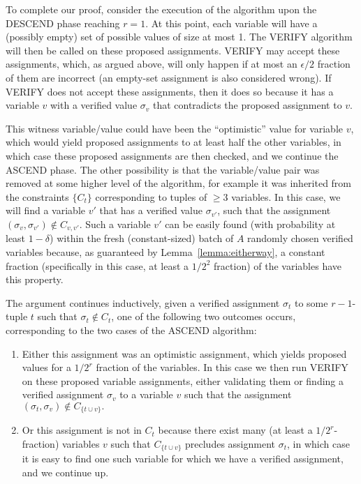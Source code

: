 \documentclass[final,12pt]{colt2018}
\newcommand{\eps}{\epsilon}
\begin{document}
To complete our proof, consider the execution of the algorithm upon the DESCEND phase reaching $r=1$.  At this point, each variable will have a (possibly empty) set of possible values of size at most 1.  The VERIFY algorithm will then be called on these proposed assignments.  VERIFY may accept these assignments, which, as argued above, will only happen if at most an $\eps/2$ fraction of them are incorrect (an empty-set assignment is also considered wrong). If VERIFY does not accept these assignments, then it does so because it has a variable $v$ with a verified value $\sigma_v$ that contradicts the proposed assignment to $v$.

This witness variable/value could have been the ``optimistic'' value for variable $v$, which would yield proposed assignments to at least half the other variables, in which case these proposed assignments are then checked, and we continue the ASCEND phase.  The other possibility is that the variable/value pair was removed at some higher level of the algorithm, for example it was inherited from the constraints $\{C_t\}$ corresponding to tuples of $\ge 3$ variables.  In this case, we will find a variable $v'$ that has a verified value $\sigma_{v'}$, such that the assignment $(\sigma_v,\sigma_{v'}) \not \in C_{v,v'}.$  Such a variable $v'$ can be easily found (with probability at least $1-\delta$) within the fresh (constant-sized) batch of $A$ randomly chosen verified variables because, as guaranteed by Lemma~\ref{lemma:eitherway}, a constant fraction (specifically  in this case, at least a $1/2^{2}$ fraction) of the variables have this property.   

The argument continues inductively, given a verified assignment $\sigma_t$ to some $r-1$-tuple $t$ such that $\sigma_t \not \in C_t$, one of the following two outcomes occurs, corresponding to the two cases of the ASCEND algorithm:
\begin{enumerate}
\item Either this assignment was an optimistic assignment, which yields proposed values for a $1/2^r$ fraction of the variables.  In this case we then run VERIFY on these proposed variable assignments, either validating them or finding a verified assignment $\sigma_v$ to a variable $v$ such that the assignment $(\sigma_t,\sigma_v) \not \in C_{\{t \cup v\}}.$
\item Or this assignment is not in $C_t$ because there exist many (at least  a $1/2^r$-fraction) variables $v$ such that $C_{\{t \cup v\}}$ precludes assignment $\sigma_t$, in which case it is easy to find one such variable for which we have a verified assignment, and we continue up.
\end{enumerate}
\end{document}
